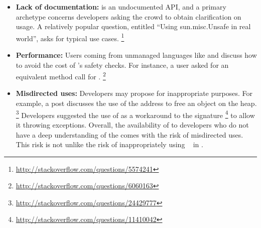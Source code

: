 \begin{itemize}
\item\textbf{Lack of documentation:}
\unsafe{} is an undocumented API,
and a primary archetype concerns developers asking the crowd to obtain clarification on usage.
A relatively popular question, entitled ``Using sun.misc.Unsafe in real world'',
asks for typical use cases.%
\footnote{\url{http://stackoverflow.com/questions/5574241}}

\item\textbf{Performance:}
Users coming from unmanaged languages like \cc{} and \cpp{} discuss how to avoid the cost of \java{}'s safety checks.
For instance, a user asked for an equivalent method call for .%
\footnote{\url{http://stackoverflow.com/questions/6060163}}

\item \textbf{Misdirected uses:}
Developers may propose \unsafe{} for inappropriate purposes.
For example, a post discusses the use of the address to free an object on the \java{} heap.%
\footnote{\url{http://stackoverflow.com/questions/24429777}}
Developers suggested the use of \unsafe{} as a workaround to the  signature%
\footnote{\url{http://stackoverflow.com/questions/11410042}}
to allow it throwing exceptions.
Overall, the availability of \unsafe{} to developers who do not have a deep understanding of the \jvm{} comes with the risk of misdirected uses.
This risk is not unlike the risk of inappropriately using ~\citep{richardsEvalThatMen2011} in \javascript{}.

\end{itemize}
